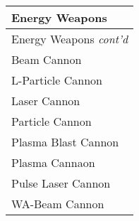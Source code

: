 \documentclass[twoside]{book}
\begin{document}
\begin{longtable}{p{1.25in}} 
  Energy Weapons
  \\
  \hline
  \hline
  \endfirsthead
  Energy Weapons \textit{cont'd}
        
  \\
  \hline
  \endhead
      
  \raggedright
           Beam Cannon 
  \tabularnewline
      
  \raggedright
           L-Particle Cannon 
  \tabularnewline
      
  \raggedright
           Laser Cannon 
  \tabularnewline
      
  \raggedright
           Particle Cannon 
  \tabularnewline
      
  \raggedright
           Plasma Blast Cannon 
  \tabularnewline
      
  \raggedright
           Plasma Cannaon 
  \tabularnewline
      
  \raggedright
           Pulse Laser Cannon 
  \tabularnewline
      
  \raggedright
           WA-Beam Cannon 
  \tabularnewline
      
\end{longtable}
    
\end{document}
